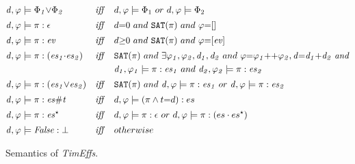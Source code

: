 \documentclass[acmsmall,10pt,review]{acmart}
\newcommand{\es}{\textcolor{black}{\ensuremath{{es}}}}
\newcommand{\timedEffects}{\emph{TimEffs}}
\newcommand{\effect}{\textcolor{black}{\ensuremath{\mathrm{\Phi}}}}
\newcommand\pure[1]{ \textcolor{black}{#1}}
\newcommand{\code}[1]{{\tt{\ensuremath{\m{#1}}}}}
\newcommand{\esn}[2]{\ensuremath{#1^{#2}}}
\newcommand{\empt}{\textcolor{black}{\ensuremath{\epsilon}}}
\newcommand{\m}{\mathit}
\begin{document}
{\begin{figure}[ht]
    \vspace{-1mm}
    \renewcommand{\arraystretch}{1}
\begin{align*} 
&\code{d, \varphi \models \effect_1 {\vee} \effect_2}  
&\m{iff}\quad 
&  d, \varphi \models \effect_1 \ or \ d, \varphi \models \effect_2
\\[0.2em]
&\code{d, \varphi \models \pi : \empt }  
&\m{iff}\quad 
&  d{=}0 \ and\  {\tt{SAT}(\pi)}  \ and \ \varphi {=} [] 
\\[0.2em]
&\code{d, \varphi \models  \pi : ev }  &\m{iff}\quad 
& d {\geq} 0 \ and\ {\tt{SAT}(\pi)}  \ and \ 
\varphi {=} \code{[ev]}
  \\[0.2em]
&\code{d, \varphi \models  \pi : (\es_1{\cdot}\es_2)}  
&\m{iff}\quad 
& {\tt{SAT}(\pi)}  \ and \ \exists \code{\varphi_1, \varphi_2, d_1, d_2}\ and\ \code{
\varphi {=} \varphi_1 {+}{+} \varphi_2, d {=} d_1 {+} d_2 \ and 
}\\
& & &
\code{d_1, \varphi_1 \models  \pi : \es_1}  \ and \ 
\code{d_2, \varphi_2 \models  \pi : \es_2}  
 \\[0.2em]
&\code{d, \varphi \models  \pi : (\es_1 {\vee} \es_2)}  
&\m{iff}\quad 
& {\tt{SAT}(\pi)}  \ and \ \code{d, \varphi \models  \pi :  \es_1 } \ or \ 
 \code{d, \varphi \models  \pi :  \es_2}  
\\[0.2em]
&\code{d, \varphi \models  \pi : \es \# t }  
&\m{iff}\quad 
& d, \varphi \models  (\pi \wedge t{=}d) : \es
\\[0.2em]
&\code{d,  \varphi \models \pi : \esn{\es}{\star}  }  
&\m{iff}\quad 
&d, \varphi \models \pi :  \empt \ or \ 
d, \varphi \models \pi :  (\es \cdot \esn{\es}{\star} ) 
 \\[0.2em]
& \code{d, \varphi \models False : \bot }  
&\m{iff}\quad 
&   otherwise
\end{align*}
    \vspace{-3mm}
\caption{Semantics of \timedEffects.}
\label{fig:Sementic}
  \vspace{-1mm}
\end{figure}


}
\end{document}
